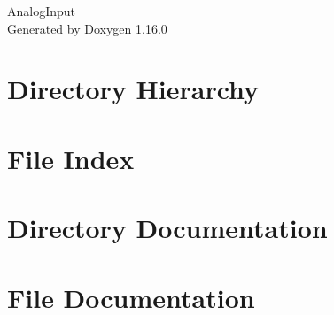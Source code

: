 \documentclass[twoside]{book}
\newcommand{\+}{\discretionary{\mbox{\scriptsize$\hookleftarrow$}}{}{}}
\newcommand{\clearemptydoublepage}{%
    \newpage{\pagestyle{empty}\cleardoublepage}%
  }
\begin{document}
  \raggedbottom
    \hypersetup{pageanchor=false,
                bookmarksnumbered=true,
                pdfencoding=unicode
               }
  \begin{titlepage}
  \vspace*{7cm}
  \begin{center}%
  {\Large Analog\+Input}\\
  \vspace*{1cm}
  {\large Generated by Doxygen 1.16.0}\\
  \end{center}
  \end{titlepage}
  \clearemptydoublepage
  \tableofcontents
  \clearemptydoublepage
  \hypersetup{pageanchor=true}
\chapter{Directory Hierarchy}

\chapter{File Index}

\chapter{Directory Documentation}

\chapter{File Documentation}

  \backmatter
  \newpage
  \clearemptydoublepage
  \printindex
\end{document}
